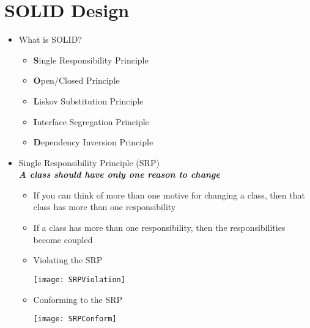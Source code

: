 %
%
%
\section{SOLID Design}

\begin{itemize}
	\item What is SOLID?
	\begin{itemize}
		\item \textbf{S}ingle Responsibility Principle
		\item \textbf{O}pen/Closed Principle
		\item \textbf{L}iskov Substitution Principle
		\item \textbf{I}nterface Segregation Principle
		\item \textbf{D}ependency Inversion Principle
	\end{itemize}

	\item Single Responsibility Principle (SRP)\\
	\textbf{\emph{A class should have only one reason to change}}
	\begin{itemize}
		\item If you can think of more than one motive for changing a class, then that class has more than one responsibility
		\item If a class has more than one responsibility, then the responsibilities become coupled
		\item Violating the SRP\\
		\begin{center}
			\texttt{[image: SRPViolation]}
		\end{center}
		\item Conforming to the SRP
		\begin{center}
			\texttt{[image: SRPConform]}
		\end{center}
	\end{itemize}


\end{itemize}
